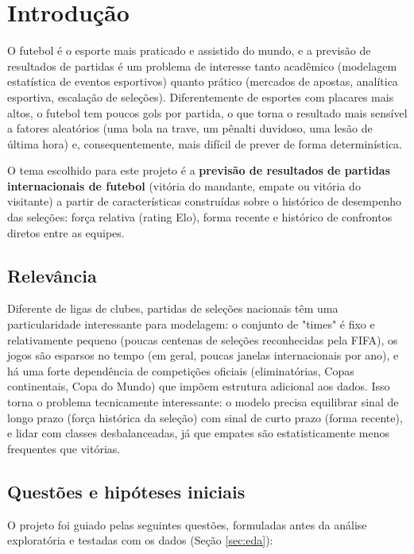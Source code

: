 \documentclass[12pt,a4paper]{article}
\begin{document}
\clearpage

\tableofcontents

\clearpage


\section{Introdução}

O futebol é o esporte mais praticado e assistido do mundo, e a previsão de resultados de partidas é um problema de interesse tanto acadêmico (modelagem estatística de eventos esportivos) quanto prático (mercados de apostas, analítica esportiva, escalação de seleções). Diferentemente de esportes com placares mais altos, o futebol tem poucos gols por partida, o que torna o resultado mais sensível a fatores aleatórios (uma bola na trave, um pênalti duvidoso, uma lesão de última hora) e, consequentemente, mais difícil de prever de forma determinística.

O tema escolhido para este projeto é a \textbf{previsão de resultados de partidas internacionais de futebol} (vitória do mandante, empate ou vitória do visitante) a partir de características construídas sobre o histórico de desempenho das seleções: força relativa (rating Elo), forma recente e histórico de confrontos diretos entre as equipes.

\subsection{Relevância}

Diferente de ligas de clubes, partidas de seleções nacionais têm uma particularidade interessante para modelagem: o conjunto de "times" é fixo e relativamente pequeno (poucas centenas de seleções reconhecidas pela FIFA), os jogos são esparsos no tempo (em geral, poucas janelas internacionais por ano), e há uma forte dependência de competições oficiais (eliminatórias, Copas continentais, Copa do Mundo) que impõem estrutura adicional aos dados. Isso torna o problema tecnicamente interessante: o modelo precisa equilibrar sinal de longo prazo (força histórica da seleção) com sinal de curto prazo (forma recente), e lidar com classes desbalanceadas, já que empates são estatisticamente menos frequentes que vitórias.

\subsection{Questões e hipóteses iniciais}

O projeto foi guiado pelas seguintes questões, formuladas antes da análise
exploratória e testadas com os dados (Seção \ref{sec:eda}):
\end{document}
